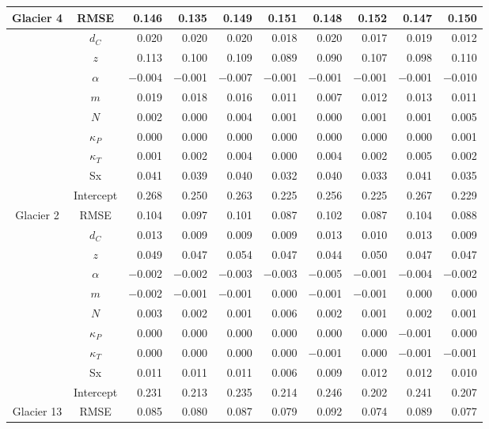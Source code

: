 \documentclass[12pt]{article}
\begin{document}
\begin{table}
\begin{tabular}{ccrrrrrrrr}
\multirow{-10}{*}{Glacier 4} & RMSE & 0.146 & 0.135 & 0.149 & 0.151 & 0.148 & 0.152 & 0.147 & 0.150 \\ \hline
 & $d_C$ & 0.020 & 0.020 & 0.020 & 0.018 & 0.020 & 0.017 & 0.019 & 0.012 \\
 & $z$ & 0.113 & 0.100 & 0.109 & 0.089 & 0.090 & 0.107 & 0.098 & 0.110 \\
 & $\alpha$ & $-$0.004 & $-$0.001 & $-$0.007 & $-$0.001 & $-$0.001 & $-$0.001 & $-$0.001 & $-$0.010 \\
 & $m$ & 0.019 & 0.018 & 0.016 & 0.011 & 0.007 & 0.012 & 0.013 & 0.011 \\
 & $N$ & 0.002 & 0.000 & 0.004 & 0.001 & 0.000 & 0.001 & 0.001 & 0.005 \\
 & $\kappa_P$ & 0.000 & 0.000 & 0.000 & 0.000 & 0.000 & 0.000 & 0.000 & 0.001 \\
 & $\kappa_T$ & 0.001 & 0.002 & 0.004 & 0.000 & 0.004 & 0.002 & 0.005 & 0.002 \\
 & Sx & 0.041 & 0.039 & 0.040 & 0.032 & 0.040 & 0.033 & 0.041 & 0.035 \\
 & Intercept & 0.268 & 0.250 & 0.263 & 0.225 & 0.256 & 0.225 & 0.267 & 0.229 \\
\multirow{-10}{*}{Glacier 2} & RMSE & 0.104 & 0.097 & 0.101 & 0.087 & 0.102 & 0.087 & 0.104 & 0.088 \\ \hline
 
 & $d_C$ & 0.013 & 0.009 & 0.009 & 0.009 & 0.013 & 0.010 & 0.013 & 0.009 \\
 
 & $z$ & 0.049 & 0.047 & 0.054 & 0.047 & 0.044 & 0.050 & 0.047 & 0.047 \\
 
 & $\alpha$ & $-$0.002 & $-$0.002 & $-$0.003 & $-$0.003 & $-$0.005 & $-$0.001 & $-$0.004 & $-$0.002 \\
 
 & $m$ & $-$0.002 & $-$0.001 & $-$0.001 & 0.000 & $-$0.001 & $-$0.001 & 0.000 & 0.000 \\
 
 & $N$ & 0.003 & 0.002 & 0.001 & 0.006 & 0.002 & 0.001 & 0.002 & 0.001 \\
 
 & $\kappa_P$ & 0.000 & 0.000 & 0.000 & 0.000 & 0.000 & 0.000 & $-$0.001 & 0.000 \\
 
 & $\kappa_T$ & 0.000 & 0.000 & 0.000 & 0.000 & $-$0.001 & 0.000 & $-$0.001 & $-$0.001 \\
 
 & Sx & 0.011 & 0.011 & 0.011 & 0.006 & 0.009 & 0.012 & 0.012 & 0.010 \\
 
 & Intercept & 0.231 & 0.213 & 0.235 & 0.214 & 0.246 & 0.202 & 0.241 & 0.207 \\
 
\multirow{-10}{*}{Glacier 13} & RMSE & 0.085 & 0.080 & 0.087 & 0.079 & 0.092 & 0.074 & 0.089 & 0.077

\end{tabular}
\end{table}
\end{document}
